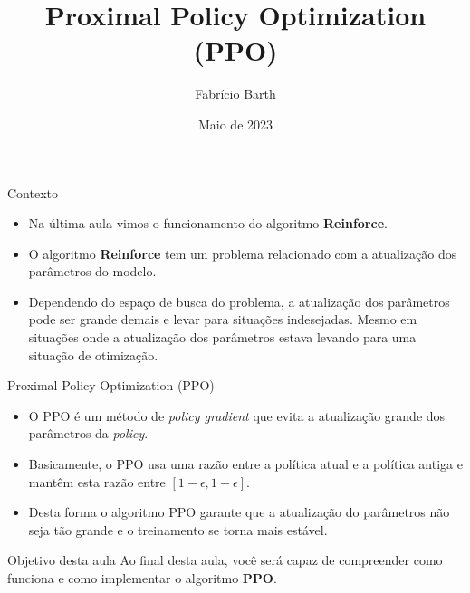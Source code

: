 \documentclass{beamer}
\begin{document}
	
\title{Proximal Policy Optimization (PPO)} 
\author{Fabrício Barth}
\date{Maio de 2023}
	
\maketitle

\def\HiLi{\leavevmode\rlap{\hbox to \hsize{\color{yellow!50}\leaders\hrule height .8\baselineskip depth .5ex\hfill}}}
	
\def\TA{\leavevmode\rlap{\hbox to \hsize{\color{cyan!50}\leaders\hrule height .8\baselineskip depth .5ex\hfill}}}

\def\TB{\leavevmode\rlap{\hbox to \hsize{\color{red!50}\leaders\hrule height .8\baselineskip depth .5ex\hfill}}}
	
\begin{frame}{Contexto}
\begin{itemize}
	\item Na última aula vimos o funcionamento do algoritmo \textbf{Reinforce}. 
	\item O algoritmo \textbf{Reinforce} tem um problema relacionado com a atualização dos parâmetros do modelo. 
	\item Dependendo do espaço de busca do problema, a atualização dos parâmetros pode ser grande demais e levar para situações indesejadas. Mesmo em situações onde a atualização dos parâmetros estava levando para uma situação de otimização. 
\end{itemize}
\end{frame}

\begin{frame}{Proximal Policy Optimization (PPO)}
	\begin{itemize}
		\item O PPO é um método de \textit{policy gradient} que evita a atualização grande dos parâmetros da \textit{policy}.
		\item Basicamente, o PPO usa uma razão entre a política atual e a política antiga e mantêm esta razão entre $\left[ 1 - \epsilon, 1 + \epsilon \right]$.
		\item Desta forma o algoritmo PPO garante que a atualização do parâmetros não seja tão grande e o treinamento se torna mais estável. 
	\end{itemize}
	
	
\end{frame}
	
\begin{frame}{Objetivo desta aula}
	Ao final desta aula, você será capaz de compreender como funciona e como implementar o algoritmo \textbf{PPO}.
\end{frame}
\end{document}
